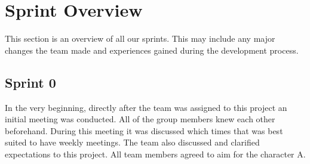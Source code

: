 \section{Sprint Overview}
\label{sec:sprintOverview}
This section is an overview of all our sprints. This may include any major changes the team made and experiences gained during the development process. 

\subsection{Sprint 0}
In the very beginning, directly after the team was assigned to this project an initial meeting was conducted. All of the group members knew each other beforehand. During this meeting it was discussed which times that was best suited to have weekly meetings. The team also discussed and clarified expectations to this project. All team members agreed to aim for the character A.






